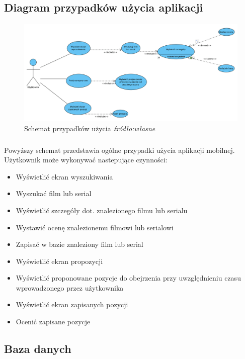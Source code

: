 \documentclass[12pt,oneside,a4paper]{report}
\begin{document}
\subsection{Diagram przypadków użycia aplikacji}
\begin{figure}[ht!]
	\centering
	\includegraphics[width=17cm]{useCase'y}
	\caption{Schemat przypadków użycia 
		\textit{źródło:własne }}
	\label{useCase'y}
\end{figure}
\subparagraph{}Powyższy schemat przedstawia ogólne przypadki użycia aplikacji mobilnej. Użytkownik może wykonywać nastepujące czynności:
\begin{itemize}
	\item Wyświetlić ekran wyszukiwania
	\item Wyszukać film lub serial
	\item Wyświetlić szczegóły dot. znalezionego filmu lub serialu
	\item Wystawić ocenę znalezionemu filmowi lub serialowi
	\item Zapisać w bazie znaleziony film lub serial
	\item Wyświetlić ekran propozycji
	\item Wyświetlić proponowane pozycje do obejrzenia przy uwzględnieniu czasu wprowadzonego przez użytkownika
	\item Wyświetlić ekran zapisanych pozycji
	\item Ocenić zapisane pozycje
\end{itemize}
\subsection{Baza danych}
\end{document}
